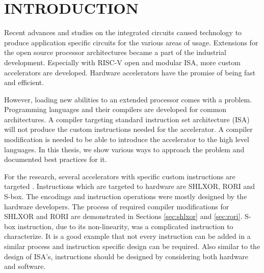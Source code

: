 \chapter{INTRODUCTION}\label{Ch1}

Recent advances and studies on the integrated circuits caused technology to produce application specific circuits for the various areas of usage. Extensions for the open source processor architectures became a part of the industrial development. Especially with RISC-V open and modular ISA, more custom accelerators are developed. Hardware accelerators have the promise of being fast and efficient.

However, loading new abilities to an extended processor comes with a problem. Programming languages and their compilers are developed for common architectures. A compiler targeting standard instruction set architecture (ISA) will not produce the custom instructions needed for the accelerator. A compiler modification is needed to be able to introduce the accelerator to the high level languages. In this thesis, we show various ways to approach the problem and documented best practices for it. 


For the research, several accelerators with specific custom instructions are targeted \cite{Sairoglu, eryilmaz}. Instructions which are targeted to hardware are SHLXOR, RORI and S-box. The encodings and instruction operations were mostly designed by the hardware developers. The process of required compiler modifications for SHLXOR and RORI are demonstrated in Sections \ref{sec:shlxor} and \ref{sec:rori}. S-box instruction, due to its non-linearity, was a complicated instruction to characterize. It is a good example that not every instruction can be added in a similar process and instruction specific design can be required. 
Also similar to the design of ISA's, instructions should be designed by considering both hardware and software. 


